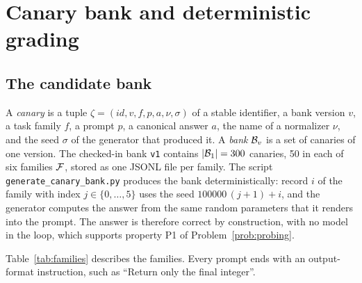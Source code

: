 \section{Canary bank and deterministic grading}
\label{sec:bank}

\subsection{The candidate bank}
\label{sec:bank_content}

A \emph{canary} is a tuple $\zeta = (\mathit{id}, v, f, p, a, \nu, \sigma)$ of a
stable identifier, a bank version $v$, a task family $f$, a prompt $p$, a
canonical answer $a$, the name of a normalizer $\nu$, and the seed $\sigma$ of
the generator that produced it. A \emph{bank} $\mathcal{B}_v$ is a set of canaries of
one version. The checked-in bank \texttt{v1} contains $|\mathcal{B}_1| = 300$
canaries, 50 in each of six families $\mathcal{F}$, stored as one JSONL file per
family. The script \texttt{generate\_canary\_bank.py} produces the bank
deterministically: record $i$ of the family with index $j \in \{0,\dots,5\}$
uses the seed $100000\,(j+1) + i$, and the generator computes the answer from
the same random parameters that it renders into the prompt. The answer is
therefore correct by construction, with no model in the loop, which supports
property P1 of Problem~\ref{prob:probing}.

Table~\ref{tab:families} describes the families. Every prompt ends with an
output-format instruction, such as ``Return only the final integer''.

